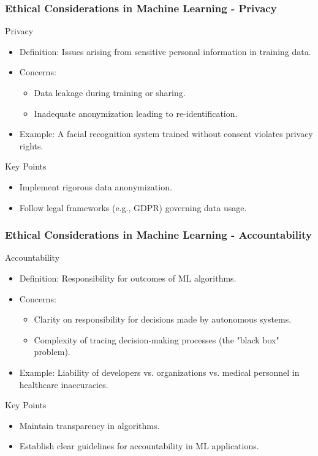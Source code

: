 \documentclass{beamer}
\begin{document}
\begin{frame}[fragile]
    \frametitle{Ethical Considerations in Machine Learning - Privacy}
    \begin{block}{Privacy}
        \begin{itemize}
            \item Definition: Issues arising from sensitive personal information in training data.
            \item Concerns:
            \begin{itemize}
                \item Data leakage during training or sharing.
                \item Inadequate anonymization leading to re-identification.
            \end{itemize}
            \item Example: A facial recognition system trained without consent violates privacy rights.
        \end{itemize}
    \end{block}
    \begin{block}{Key Points}
        \begin{itemize}
            \item Implement rigorous data anonymization.
            \item Follow legal frameworks (e.g., GDPR) governing data usage.
        \end{itemize}
    \end{block}
\end{frame}

\begin{frame}[fragile]
    \frametitle{Ethical Considerations in Machine Learning - Accountability}
    \begin{block}{Accountability}
        \begin{itemize}
            \item Definition: Responsibility for outcomes of ML algorithms.
            \item Concerns:
            \begin{itemize}
                \item Clarity on responsibility for decisions made by autonomous systems.
                \item Complexity of tracing decision-making processes (the "black box" problem).
            \end{itemize}
            \item Example: Liability of developers vs. organizations vs. medical personnel in healthcare inaccuracies.
        \end{itemize}
    \end{block}
    \begin{block}{Key Points}
        \begin{itemize}
            \item Maintain transparency in algorithms.
            \item Establish clear guidelines for accountability in ML applications.
        \end{itemize}
    \end{block}
\end{frame}
\end{document}
